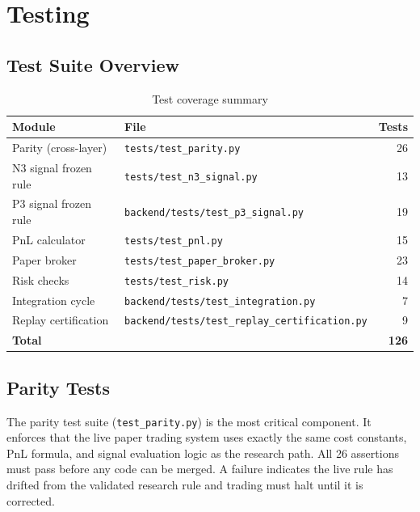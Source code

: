\documentclass[12pt, a4paper]{article}
\theoremstyle{definition}
\begin{document}
\section{Testing}

\subsection{Test Suite Overview}

\begin{table}[H]
\centering
\caption{Test coverage summary}
\begin{tabular}{llr}
\toprule
\textbf{Module} & \textbf{File} & \textbf{Tests} \\
\midrule
Parity (cross-layer) & \texttt{tests/test\_parity.py}             & 26 \\
N3 signal frozen rule & \texttt{tests/test\_n3\_signal.py}         & 13 \\
P3 signal frozen rule & \texttt{backend/tests/test\_p3\_signal.py} & 19 \\
PnL calculator       & \texttt{tests/test\_pnl.py}                & 15 \\
Paper broker         & \texttt{tests/test\_paper\_broker.py}      & 23 \\
Risk checks          & \texttt{tests/test\_risk.py}               & 14 \\
Integration cycle    & \texttt{backend/tests/test\_integration.py} & 7 \\
Replay certification & \texttt{backend/tests/test\_replay\_certification.py} & 9 \\
\midrule
\textbf{Total} & & \textbf{126} \\
\bottomrule
\end{tabular}
\end{table}

\subsection{Parity Tests}

The parity test suite (\texttt{test\_parity.py}) is the most critical component.
It enforces that the live paper trading system uses exactly the same cost
constants, PnL formula, and signal evaluation logic as the research path.
All 26 assertions must pass before any code can be merged. A failure indicates
the live rule has drifted from the validated research rule and trading must
halt until it is corrected.
\end{document}
